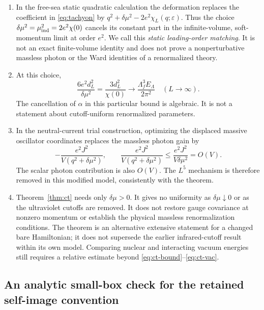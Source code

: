 \begin{remark}
\label{rem:ct-choice}
\begin{enumerate}[label=(\alph*)]
\item In the free-sea static quadratic calculation the deformation replaces
the coefficient in \eqref{eq:tachyon} by
\(q^2+\delta\mu^2-2e^2\chi_L(q;\varepsilon)\).
Thus the choice
\(\delta\mu^2=\mu_{\rm ind}^2=2e^2\chi(0)\) cancels its constant part
in the infinite-volume, soft-momentum limit at order \(e^2\).
We call this \emph{static leading-order matching}. It is not an exact
finite-volume identity and does not prove a nonperturbative massless photon
or the Ward identities of a renormalized theory.
\item At this choice,
\[
 \frac{6e^2d_L^2}{\delta\mu^2}
 =\frac{3d_L^2}{\chi(0)}
 \longrightarrow\frac{\Lambda_f^3E_\Lambda}{2\pi^2}
 \quad(L\to\infty).
\]
The cancellation of \(\alpha\) in this particular bound is algebraic.
It is not a statement about cutoff-uniform renormalized parameters.
\item In the neutral-current trial construction, optimizing the displaced
massive oscillator coordinates replaces the massless photon gain by
\[
 -\frac{e^2J^2}{V(q^2+\delta\mu^2)},
 \qquad
 \frac{e^2J^2}{V(q^2+\delta\mu^2)}
 \leq\frac{e^2J^2}{V\delta\mu^2}=O(V).
\]
The scalar photon contribution is also \(O(V)\). The \(L^5\) mechanism
is therefore removed in this modified model, consistently with the theorem.
\item Theorem~\ref{thm:ct} needs only \(\delta\mu>0\). It gives no
uniformity as \(\delta\mu\downarrow0\) or as the ultraviolet cutoffs are
removed. It does not restore gauge covariance at nonzero momentum or
establish the physical massless renormalization conditions. The theorem
is an alternative extensive statement for a changed bare Hamiltonian;
it does not supersede the earlier infrared-cutoff result within its own
model. Comparing nuclear and interacting vacuum energies still requires
a relative estimate beyond \eqref{eq:ct-bound}--\eqref{eq:ct-vac}.
\end{enumerate}
\end{remark}

\subsection{An analytic small-box check for the retained self-image convention}

